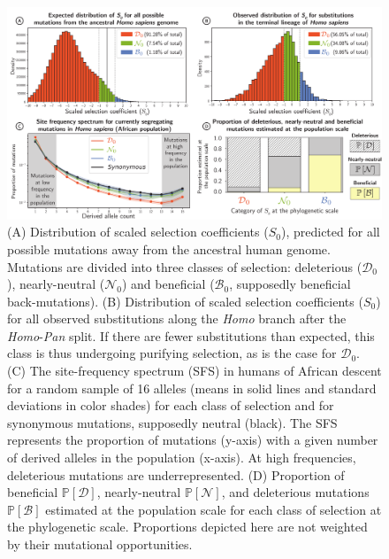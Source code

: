 \documentclass[12pt]{article}
\newcommand{\proba}{\mathbb{P}}
\newcommand{\Sphy}{S_{0}}
\newcommand{\SphyDel}{\mathcal{D}_0}
\newcommand{\SphyNeu}{\mathcal{N}_0}
\newcommand{\SphyBen}{\mathcal{B}_0}
\newcommand{\SpopDel}{\mathcal{D}}
\newcommand{\SpopNeu}{\mathcal{N}}
\newcommand{\SpopBen}{\mathcal{B}}
\newcommand{\ProbaPopDel}{\proba [ \SpopDel]}
\newcommand{\ProbaPopNeu}{\proba [ \SpopNeu ]}
\newcommand{\ProbaPopBen}{\proba [ \SpopBen ]}
\begin{document}
\begin{figure}[!ht]
    \centering
    \includegraphics[width=\textwidth, page=1] {artworks/figure.homo-afr-results}
    \caption{
        (A) Distribution of scaled selection coefficients ($\Sphy$), predicted for all possible mutations away from the ancestral human genome.
        Mutations are divided into three classes of selection: deleterious ($\SphyDel$), nearly-neutral ($\SphyNeu$) and beneficial ($\SphyBen$, supposedly beneficial back-mutations).
        (B) Distribution of scaled selection coefficients ($\Sphy$) for all observed substitutions along the \textit{Homo} branch after the \textit{Homo}-\textit{Pan} split.
        If there are fewer substitutions than expected, this class is thus undergoing purifying selection, as is the case for $\SphyDel$.
        (C) The site-frequency spectrum (SFS) in humans of African descent for a random sample of 16 alleles (means in solid lines and standard deviations in color shades) for each class of selection and for synonymous mutations, supposedly neutral (black). The SFS represents the proportion of mutations (y-axis) with a given number of derived alleles in the population (x-axis).
        At high frequencies, deleterious mutations are underrepresented.
        (D) Proportion of beneficial $\ProbaPopDel$, nearly-neutral $\ProbaPopNeu$, and deleterious mutations $\ProbaPopBen$ estimated at the population scale for each class of selection at the phylogenetic scale. Proportions depicted here are not weighted by their mutational opportunities.
    }
    \label{fig:homo-afr-results}
\end{figure}
\end{document}
